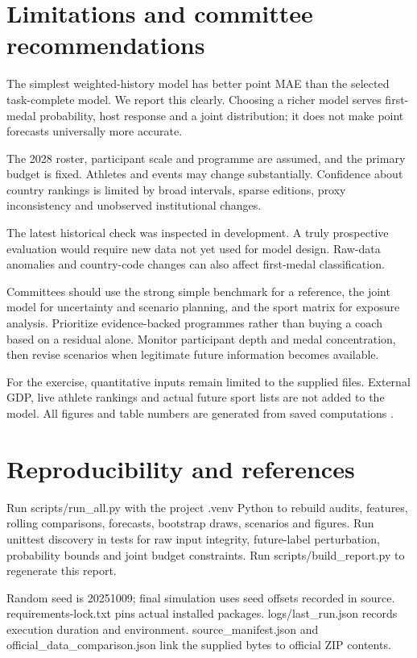 \documentclass[11pt,a4paper]{article}
\begin{document}
\section{Limitations and committee recommendations}
The simplest weighted-history model has better point MAE than the selected task-complete model. We report this clearly. Choosing a richer model serves first-medal probability, host response and a joint distribution; it does not make point forecasts universally more accurate.

The 2028 roster, participant scale and programme are assumed, and the primary budget is fixed. Athletes and events may change substantially. Confidence about country rankings is limited by broad intervals, sparse editions, proxy inconsistency and unobserved institutional changes.

The latest historical check was inspected in development. A truly prospective evaluation would require new data not yet used for model design. Raw-data anomalies and country-code changes can also affect first-medal classification.

Committees should use the strong simple benchmark for a reference, the joint model for uncertainty and scenario planning, and the sport matrix for exposure analysis. Prioritize evidence-backed programmes rather than buying a coach based on a residual alone. Monitor participant depth and medal concentration, then revise scenarios when legitimate future information becomes available.

For the exercise, quantitative inputs remain limited to the supplied files. External GDP, live athlete rankings and actual future sport lists are not added to the model. All figures and table numbers are generated from saved computations \cite{comap-problem,comap-data,nb2-doc}.

\section{Reproducibility and references}
Run scripts/run\_all.py with the project .venv Python to rebuild audits, features, rolling comparisons, forecasts, bootstrap draws, scenarios and figures. Run unittest discovery in tests for raw input integrity, future-label perturbation, probability bounds and joint budget constraints. Run scripts/build\_report.py to regenerate this report.

Random seed is 20251009; final simulation uses seed offsets recorded in source. requirements-lock.txt pins actual installed packages. logs/last\_run.json records execution duration and environment. source\_manifest.json and official\_data\_comparison.json link the supplied bytes to official ZIP contents.
\end{document}
